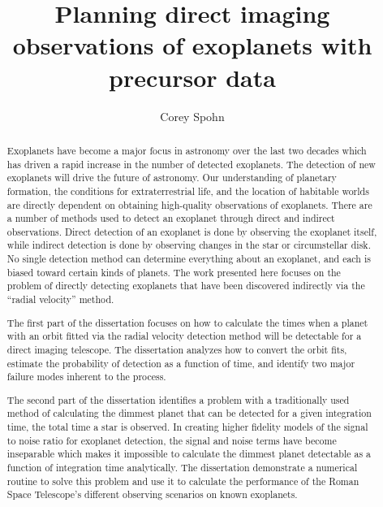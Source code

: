 \documentclass[phd,tocprelim]{cornell}
\title {Planning direct imaging observations of exoplanets with precursor data}
\author {Corey Spohn}
\begin{document}
\maketitle
\makecopyright

\begin{abstract}
Exoplanets have become a major focus in astronomy over the last two decades which has
driven a rapid increase in the number of detected exoplanets. The detection of new
exoplanets will drive the future of astronomy. Our understanding of planetary
formation, the conditions for extraterrestrial life, and the location of
habitable worlds are directly dependent on obtaining high-quality observations
of exoplanets. There are a number of methods used to detect an exoplanet
through direct and indirect observations. Direct detection of an exoplanet is
done by observing the exoplanet itself, while indirect detection is done by
observing changes in the star or circumstellar disk. No single detection method can determine
everything about an exoplanet, and each is biased toward certain kinds of
planets. The work presented here focuses on the problem of directly
detecting exoplanets that have been discovered indirectly 
via the ``radial velocity'' method.

The first part of the dissertation focuses on how to calculate the times when a
planet with an orbit fitted via the radial velocity detection method will be
detectable for a direct imaging telescope. The dissertation analyzes how to convert the orbit
fits, estimate the probability of detection as a function of time, and identify
two major failure modes inherent to the process.

The second part of the dissertation identifies a problem with a traditionally
used method of calculating the dimmest planet that can be detected for a given
integration time, the total time a star is observed. In creating higher
fidelity models of the signal to noise ratio for exoplanet detection, the
signal and noise terms have become inseparable which makes it impossible to
calculate the dimmest planet detectable as a function of integration time
analytically. The dissertation demonstrate a numerical routine to solve this
problem and use it to calculate the performance of the Roman Space Telescope's
different observing scenarios on known exoplanets.


\end{abstract}
\end{document}
